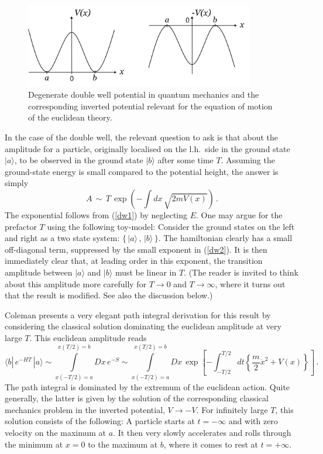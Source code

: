 \documentclass[12pt]{article}
\newcommand{\be}{\begin{equation}}
\newcommand{\ee}{\end{equation}}
\numberwithin{equation}{section}
\begin{document}
\begin{figure}[ht]
\begin{center} 
\includegraphics[width=10cm]{dw.png}
\caption{Degenerate double well potential in quantum mechanics and the corresponding inverted potential relevant for the equation of motion of the euclidean theory.}
\label{dw} 
\end{center}
\end{figure}

In the case of the double well, the relevant question to ask is that about the amplitude for a particle, originally localised on the l.h.~side in the ground state $|a\rangle$, to be observed in the ground state $|b\rangle$ after some time $T$. Assuming the ground-state energy is small compared to the potential height, the answer is simply
\be
A\,\sim\, T\,\exp\left(-\int dx\,\sqrt{2mV(x)}\right)\,.
\label{dw2}
\ee
The exponential follows from (\ref{dw1}) by neglecting $E$. One may argue for the prefactor $T$ using the following toy-model: Consider the ground states on the left and right as a two state system: $\{\,|a\rangle\,,\,|b\rangle\,\}$. The hamiltonian clearly has a small off-diagonal term, suppressed by the small exponent in (\ref{dw2}). It is then immediately clear that, at leading order in this exponent, the transition amplitude between $|a\rangle$ and $|b\rangle$ must be linear in $T$. (The reader is invited to think about this amplitude more carefully for $T\to 0$ and $T\to\infty$, where it turns out that the result is modified. See also the discussion below.)

Coleman \cite{Coleman:1985rnk} presents a very elegant path integral derivation for this result by considering the classical solution dominating the euclidean amplitude at very large $T$. This euclidean amplitude reads
\be
\langle b|\,e^{-HT}\,|a\rangle 
\sim \int\limits_{x(-T/2)=a}^{x(T/2)=b} Dx\,e^{-S}
\sim \int\limits_{x(-T/2)=a}^{x(T/2)=b} Dx \,\exp\left[-\int_{-T/2}^{T/2} dt\left\{\frac{m}{2}\dot{x}^2+V(x)\right\}\right]\,.
\ee
The path integral is dominated by the extremum of the euclidean action. Quite generally, the latter is given by the solution of the corresponding classical mechanics problem in the inverted potential, $V\to-V$. For infinitely large $T$, this solution consists of the following: A particle starts at $t=-\infty$ and with zero velocity on the maximum at $a$. It then very slowly accelerates and rolls through the minimum at $x=0$ to the maximum at $b$, where it comes to rest at $t=+\infty$.
\end{document}
